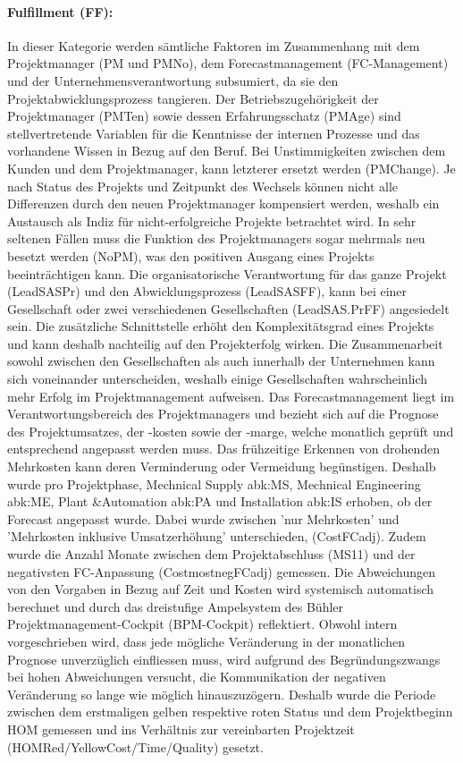 \paragraph{Fulfillment (FF): } In dieser Kategorie werden sämtliche Faktoren im Zusammenhang mit dem Projektmanager (PM und PMNo), dem Forecastmanagement (FC-Management) und der Unternehmensverantwortung subsumiert, da sie den Projektabwicklungsprozess tangieren. Der Betriebszugehörigkeit der Projektmanager (PMTen) sowie dessen Erfahrungsschatz (PMAge) sind stellvertretende Variablen für die Kenntnisse der internen Prozesse und das vorhandene Wissen in Bezug auf den Beruf. Bei Unstimmigkeiten zwischen dem Kunden und dem Projektmanager, kann letzterer ersetzt werden (PMChange). Je nach Status des Projekts und Zeitpunkt des Wechsels können nicht alle Differenzen durch den neuen Projektmanager kompensiert werden, weshalb ein Austausch als Indiz für nicht-erfolgreiche Projekte betrachtet wird. In sehr seltenen Fällen muss die Funktion des Projektmanagers sogar mehrmals neu besetzt werden (NoPM), was den positiven Ausgang eines Projekts beeinträchtigen kann.
\newline Die organisatorische Verantwortung für das ganze Projekt (LeadSASPr) und den Abwicklungsprozess (LeadSASFF), kann bei einer Gesellschaft oder zwei verschiedenen Gesellschaften (LeadSAS.PrFF) angesiedelt sein. Die zusätzliche Schnittstelle erhöht den Komplexitätsgrad eines Projekts und kann deshalb nachteilig auf den Projekterfolg wirken. Die Zusammenarbeit sowohl zwischen den Gesellschaften als auch innerhalb der Unternehmen kann sich voneinander unterscheiden, weshalb einige Gesellschaften wahrscheinlich mehr Erfolg im Projektmanagement aufweisen.
\newline Das  Forecastmanagement liegt im Verantwortungsbereich des Projektmanagers und bezieht sich auf die Prognose des Projektumsatzes, der -kosten sowie der -marge, welche monatlich geprüft und entsprechend angepasst werden muss. Das frühzeitige Erkennen von drohenden Mehrkosten kann deren Verminderung oder Vermeidung begünstigen. Deshalb wurde pro Projektphase, Mechnical Supply \gls{abk:MS}, Mechnical Engineering \gls{abk:ME}, Plant \&Automation \gls{abk:PA} und Installation \gls{abk:IS} erhoben, ob der Forecast angepasst wurde. Dabei wurde zwischen 'nur Mehrkosten' und 'Mehrkosten inklusive Umsatzerhöhung' unterschieden, (CostFCadj). Zudem wurde die Anzahl Monate zwischen dem Projektabschluss (MS11) und der negativsten FC-Anpassung (CostmostnegFCadj) gemessen. Die Abweichungen von den Vorgaben in Bezug auf Zeit und Kosten wird systemisch automatisch berechnet und  durch das dreistufige Ampelsystem des Bühler Projektmanagement-Cockpit (BPM-Cockpit) reflektiert. Obwohl intern vorgeschrieben wird, dass jede mögliche Veränderung in der monatlichen Prognose unverzüglich einfliessen muss, wird aufgrund des Begründungszwangs bei hohen Abweichungen versucht, die Kommunikation der negativen Veränderung so lange wie möglich hinauszuzögern.  %
Deshalb wurde die Periode zwischen dem erstmaligen gelben respektive roten Status und dem Projektbeginn HOM gemessen und ins Verhältnis zur vereinbarten Projektzeit (HOMRed/YellowCost/Time/Quality) gesetzt.  %
